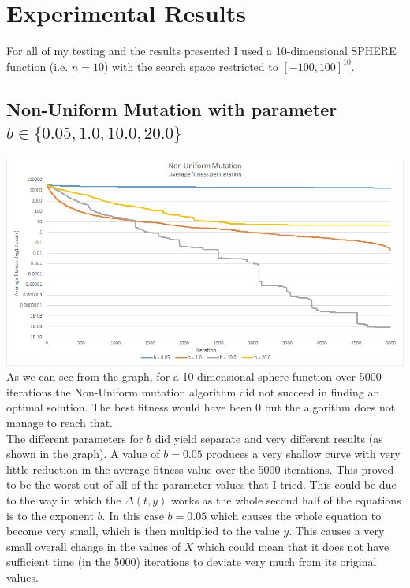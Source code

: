 \documentclass{article}
\begin{document}
    \section{Experimental Results}
     For all of my testing and the results presented I used a 10-dimensional SPHERE function (i.e. $n=10$) with the search space restricted to $[-100,100]^{10}$.

	\subsection{Non-Uniform Mutation with parameter $b \in \{0.05, 1.0, 10.0, 20.0 \} $}
	\includegraphics[width=1\textwidth]{Images/NonUniformMutation}\\
	
	As we can see from the graph, for a 10-dimensional sphere function over 5000 iterations the Non-Uniform mutation algorithm did not succeed in finding an optimal solution. The best fitness would have been $0$ but the algorithm does not manage to reach that.\\
	
	The different parameters for $b$ did yield separate and very different results (as shown in the graph). A value of $b=0.05$ produces a very shallow curve with very little reduction in the average fitness value over the 5000 iterations. This proved to be the worst out of all of the parameter values that I tried. This could be due to the way in which the $\Delta(t, y)$ works as the whole second half of the equations is to the exponent $b$. In this case $b=0.05$ which causes the whole equation to become very small, which is then multiplied to the value $y$. This causes a very small overall change in the values of $X$ which could mean that it does not have sufficient time (in the 5000) iterations to deviate very much from its original values.\\
	
\end{document}
